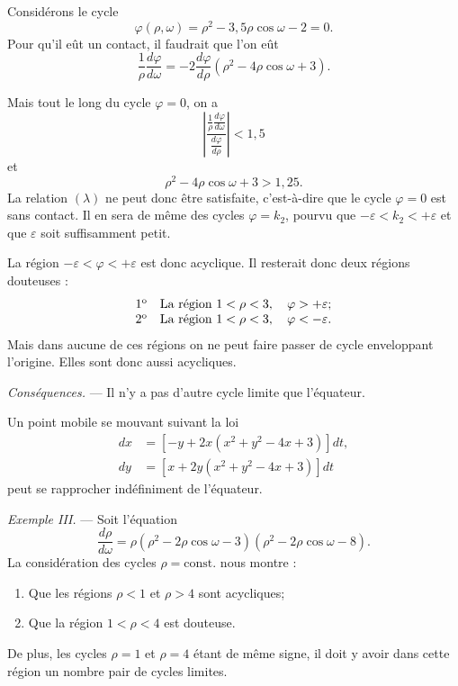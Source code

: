 \documentclass[11pt]{article}
\begin{document}
Considérons le cycle
\[
\varphi(\rho,\omega)=\rho^2-3{,}5\rho\cos\omega-2=0.
\]
Pour qu’il eût un contact, il faudrait que l’on eût
\begin{equation*}
\tag{$\lambda$}
\frac1\rho\frac{d\varphi}{d\omega}=-2\frac{d\varphi}{d\rho}(\rho^2-4\rho\cos\omega+3).
\end{equation*}

Mais tout le long du cycle $\varphi=0$, on a
\[
\left|\frac{\frac1\rho\frac{d\varphi}{d\omega}}{\frac{d\varphi}{d\rho}}\right|<1{,}5
\]
et
\[
\rho^2-4\rho\cos\omega+3>1{,}25.
\]
La relation $(\lambda)$ ne peut donc être satisfaite, c’est-à-dire que le cycle $\varphi=0$ est sans contact. Il en sera de même des cycles $\varphi=k_2$, pourvu que $-\varepsilon<k_2<+\varepsilon$ et que $\varepsilon$ soit suffisamment petit.

La région $-\varepsilon<\varphi<+\varepsilon$ est donc acyclique. Il resterait donc deux régions douteuses :
\[
\begin{array}{ll}
1\textsuperscript{o} & \text{La région }1<\rho<3,\quad \varphi>+\varepsilon;\\
2\textsuperscript{o} & \text{La région }1<\rho<3,\quad \varphi<-\varepsilon.
\end{array}
\]
Mais dans aucune de ces régions on ne peut faire passer de cycle enveloppant l’origine. Elles sont donc aussi acycliques.

\emph{Conséquences.} --- Il n’y a pas d’autre cycle limite que l’équateur.

Un point mobile se mouvant suivant la loi
\[
\begin{aligned}
dx&=[-y+2x(x^2+y^2-4x+3)]dt,\\
dy&=[x+2y(x^2+y^2-4x+3)]dt
\end{aligned}
\]
peut se rapprocher indéfiniment de l’équateur.

\emph{Exemple III.} --- Soit l’équation
\[
\frac{d\rho}{d\omega}=\rho(\rho^2-2\rho\cos\omega-3)(\rho^2-2\rho\cos\omega-8).
\]
La considération des cycles $\rho=\mathrm{const.}$ nous montre :
\begin{enumerate}[label=\arabic*\textsuperscript{o}, leftmargin=3em]
\item Que les régions $\rho<1$ et $\rho>4$ sont acycliques;
\item Que la région $1<\rho<4$ est douteuse.
\end{enumerate}

De plus, les cycles $\rho=1$ et $\rho=4$ étant de même signe, il doit y avoir dans cette région un nombre pair de cycles limites.
\end{document}
